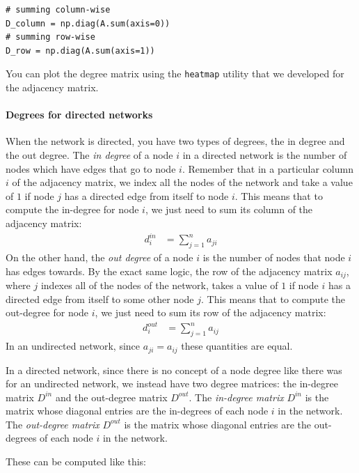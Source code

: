 \begin{lstlisting}[style=python]
# summing column-wise
D_column = np.diag(A.sum(axis=0))
# summing row-wise
D_row = np.diag(A.sum(axis=1))
\end{lstlisting}

You can plot the degree matrix using the \texttt{heatmap} utility that we developed for the adjacency matrix.

\paragraph*{Degrees for directed networks}

When the network is directed, you have two types of degrees, the {in degree} and the {out degree}. The \textit{in degree} of a node $i$ in a directed network is the number of nodes which have edges that go {to} node $i$. Remember that in a particular column $i$ of the adjacency matrix, we index all the nodes of the network and take a value of $1$ if node $j$ has a directed edge from itself to node $i$. This means that to compute the in-degree for node $i$, we just need to sum its column of the adjacency matrix:
\begin{align*}
    d_i^{in} &= \sum_{j = 1}^n a_{ji}
\end{align*}
On the other hand, the \textit{out degree} of a node $i$ is the number of nodes that node $i$ has edges towards. By the exact same logic, the row of the adjacency matrix $a_{ij}$, where $j$ indexes all of the nodes of the network, takes a value of $1$ if node $i$ has a directed edge from itself to some other node $j$. This means that to compute the out-degree for node $i$, we just need to sum its row of the adjacency matrix:
\begin{align*}
    d_i^{out} &= \sum_{j = 1}^n a_{ij}
\end{align*}
In an undirected network, since $a_{ji} = a_{ij}$ these quantities are equal. 

In a directed network, since there is no concept of a {node degree} like there was for an undirected network, we instead have two degree matrices: the {in-degree matrix} $D^{in}$ and the {out-degree matrix} $D^{out}$. The \textit{in-degree matrix} $D^{in}$ is the matrix whose diagonal entries are the in-degrees of each node $i$ in the network. The \textit{out-degree matrix} $D^{out}$ is the matrix whose diagonal entries are the out-degrees of each node $i$ in the network. 

These can be computed like this:

